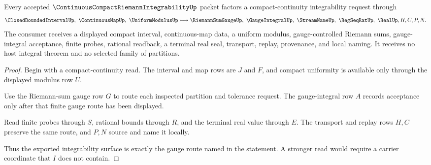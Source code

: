 \begin{theorem}
\label{thm:continuous-compact-riemann-integrability-gauge-route}
Every accepted $\ContinuousCompactRiemannIntegrabilityUp$ packet factors a compact-continuity integrability request through
$$
\ClosedBoundedIntervalUp,\ \ContinuousMapUp,\ \UniformModulusUp
\longmapsto
\RiemannSumGaugeUp,\ \GaugeIntegralUp,\ \StreamNameUp,\ \RegSeqRatUp,\ \RealUp,H,C,P,N .
$$
The consumer receives a displayed compact interval, continuous-map data, a uniform modulus, gauge-controlled Riemann sums, gauge-integral acceptance, finite probes, rational readback, a terminal real seal, transport, replay, provenance, and local naming. It receives no host integral theorem and no selected family of partitions.
\end{theorem}
\begin{proof}
Begin with a compact-continuity read. The interval and map rows are $J$ and $F$, and compact uniformity is available only through the displayed modulus row $U$.

Use the Riemann-sum gauge row $G$ to route each inspected partition and tolerance request. The gauge-integral row $A$ records acceptance only after that finite gauge route has been displayed.

Read finite probes through $S$, rational bounds through $R$, and the terminal real value through $E$. The transport and replay rows $H,C$ preserve the same route, and $P,N$ source and name it locally.

Thus the exported integrability surface is exactly the gauge route named in the statement. A stronger read would require a carrier coordinate that $I$ does not contain.
\end{proof}

